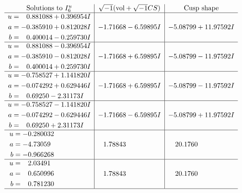 \documentclass[1p]{elsarticle_modified}
\theoremstyle{definition}
\newcommand{\I}{\sqrt{-1}}
\begin{document}
$$\begin{array}{c|c|c}  
\text{Solutions to }I^u_{6}& \I (\text{vol} + \sqrt{-1}CS) & \text{Cusp shape}\\
 \hline 
\begin{aligned}
u &= \phantom{-}0.881088 + 0.396954 I \\
a &= -0.385910 + 0.812028 I \\
b &= \phantom{-}0.400014 - 0.259730 I\end{aligned}
 & -1.71668 - 6.59895 I & -5.08799 + 11.97592 I \\ \hline\begin{aligned}
u &= \phantom{-}0.881088 - 0.396954 I \\
a &= -0.385910 - 0.812028 I \\
b &= \phantom{-}0.400014 + 0.259730 I\end{aligned}
 & -1.71668 + 6.59895 I & -5.08799 - 11.97592 I \\ \hline\begin{aligned}
u &= -0.758527 + 1.141820 I \\
a &= -0.074292 + 0.629446 I \\
b &= \phantom{-}0.69250 - 2.31173 I\end{aligned}
 & -1.71668 + 6.59895 I & -5.08799 - 11.97592 I \\ \hline\begin{aligned}
u &= -0.758527 - 1.141820 I \\
a &= -0.074292 - 0.629446 I \\
b &= \phantom{-}0.69250 + 2.31173 I\end{aligned}
 & -1.71668 - 6.59895 I & -5.08799 + 11.97592 I \\ \hline\begin{aligned}
u &= -0.280032\phantom{ +0.000000I} \\
a &= -4.73059\phantom{ +0.000000I} \\
b &= -0.966268\phantom{ +0.000000I}\end{aligned}
 & \phantom{-}1.78843\phantom{ +0.000000I} & \phantom{-}20.1760\phantom{ +0.000000I} \\ \hline\begin{aligned}
u &= \phantom{-}2.03491\phantom{ +0.000000I} \\
a &= \phantom{-}0.650996\phantom{ +0.000000I} \\
b &= \phantom{-}0.781230\phantom{ +0.000000I}\end{aligned}
 & \phantom{-}1.78843\phantom{ +0.000000I} & \phantom{-}20.1760\phantom{ +0.000000I}\\
 \hline 
 \end{array}$$\newpage\newpage\renewcommand{\arraystretch}{1}
\end{document}
